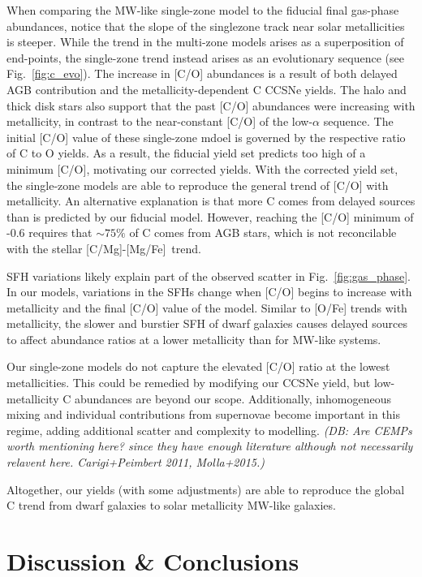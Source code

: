 \documentclass[fleqn,
referee, %
usenatbib]{mnras}
\newcommand{\caafe}{[C/Mg]-[Mg/Fe]}
\newcommand{\about}[1]{${\sim} #1$}
\newcommand{\dbnote}[1]{ {\color{Thistle} \textit{\small (DB: #1)}} }
\begin{document}
When comparing the MW-like single-zone model to the fiducial final gas-phase abundances, notice that the slope of the singlezone track near solar metallicities is steeper. 
While the trend in the multi-zone models arises as a
superposition of end-points, the single-zone trend instead arises as an evolutionary sequence (see Fig.~\ref{fig:c_evo}). The increase in [C/O] abundances is a result of both delayed AGB contribution and the metallicity-dependent C CCSNe yields.
The halo and thick disk stars also support that the past [C/O] abundances were increasing with metallicity, in contrast to the near-constant [C/O] of the low-$\alpha$ sequence.
The initial [C/O] value of these single-zone mdoel is governed by the respective ratio of C to O yields. As a result, the fiducial yield set predicts too high of a minimum [C/O], motivating our corrected yields. With the corrected yield set, the single-zone models are able to reproduce the general trend of [C/O] with metallicity.
An alternative explanation is that more C comes from delayed sources than is predicted by our fiducial model. However, reaching the [C/O] minimum of -0.6 requires that \about{75\%} of C comes from AGB stars, which is not reconcilable with the stellar \caafe\ trend.  

SFH variations likely explain part of the observed scatter in Fig.~\ref{fig:gas_phase}. 
In our models, variations in the SFHs change when [C/O] begins to increase with metallicity and the final [C/O] value of the model. Similar to [O/Fe] trends with metallicity, the slower and burstier SFH of dwarf galaxies causes delayed sources to affect abundance ratios at a lower metallicity than for MW-like systems.

Our single-zone models do not capture the elevated [C/O] ratio at the lowest metallicities. This could be remedied by modifying our CCSNe yield, but low-metallicity C abundances are beyond our scope. Additionally, inhomogeneous mixing and individual contributions from supernovae become important in this regime, adding additional scatter and complexity to modelling.
\dbnote{Are CEMPs worth mentioning here? since they have enough literature although not necessarily relavent here. Carigi+Peimbert 2011, Molla+2015.}

Altogether, our yields (with some adjustments) are able to reproduce the global C trend from dwarf galaxies to solar metallicity MW-like galaxies. 




\section{Discussion \& Conclusions}\label{sec:conclusions}
\end{document}
